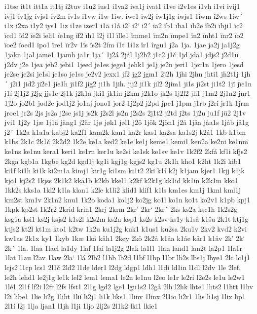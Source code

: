 i1tse
it1t
itt1a
it1tj
i2tuv
i1u2
ius1
i1va2
iva1j
ivat1
i1ve
i2v1es
i1vh
i1vi
ivij1
ivj1
iv1jg
ivjs1
iv2m
iv1s
i1vw
i1w
1iw.
iwc1
iw2j
iw1j1g
iwjs1
1iwm
i2ws
1iw´
i1x
i2xa
i1y2
iys1
1iz
i1ze
izer1
i1ä
i1å
i2'
i2`
i2´
ïa2
ïb1
ïba1
ïb2e
ïb2ï
ïbji1
ïc2
ïcd1
ïd2
ïe2i
ïeli1
ïe1ng
ïf2
ïh1
ï2j
ï1l
ïlle1
ïmme1
ïm2n
ïmpe1
ïn2
ïnht1
ïnr2
ïo2
ïoe2
ïoed1
ïpo1
ïre1
ïr2v
1ïs
ïs2t
2ím
í1t
1í1z
îr1
îrgu1
j2a
1ja.
1jae
ja2j
ja1j2g
1jakn
1jal
jame1
1jamh
ja1r
1ja´
1j2á
2jál
1j2b2
j1c2
j1č
1jd
jda1
jdjs2
j2d1u
j2dv
j2e
1jea
jeb2
jebi1
1jeed
je1es
jege1
jehk1
je1j
je2n
jeri1
1jer1n
1jero
1jesd
je2se
je2si
je1sl
je1so
je1ss
je2v2
jexx1
jf2
jg2
jgm1
2j2h
1jhi
2jhn
jhti1
jh2t1j
1jh´
j2i1
jid2
ji2e1
jie1h
ji1f2
jig2
ji1h
1jih.
jij2
ji1k
jil2
2jim1
ji1s
ji2st
ji1t2
1jï
jïe1n
j1í
2j1j2
j2jg
jjs1e
2j1k
j2k1a
jki1
jk1in
j2km
j2k1o
jk2s
1j2l2
jli1
j1m2
2j1n2
jnr1
1j2o
jo2b1
jod2e
jod1j2
jo1nj
jono1
jor2
1j2p2
j2pd
jpe1
j1pm
j1rb
j2ri
jr1k
1jrm
jroe1
jr2s
2js
js2a
j2se
js1j
js2k
j2s2l
js2n
j2s2s
2j1t2
j2td
j2ts
1j2u
ju1f
jü2
2j1v
jvi1
1j2y
1jæ
1j1ä
jäng1
j2är
1jø
jøk1
jøl1
j2ö
1jök
2jön1
j2å
1jåa
jåa1s
1jåb
jå1g
j2´
1k2a
k1a1a
kabj2
ka2f1
kam2k
kan1
ka2r
kas1
ka2sa
ka1s2j
k2á1
1kb
k1bm
k1bs
2k1c
2k1č
2k2d2
1k2e
ke1a
ked2
ke1e
ke1j
keme1
kemi1
ken2a
ke2ni
ke1nm
ke1ns
ke1nu
kera1
keri1
ke1rn
ker1u
ke2si
ke1sk
ke1sv
ke1v
1k2f2
2kfá
kf1i
kfjs2
2kga
kgb1a
1kgbe
kg2d
kgd1j
kg1i
kgj1g
kgjs2
kg1u
2k1h
kho1
k2ht
1k2i
kib1
ki1f
ki1h
ki1k
ki2m1a
kimj1
kir1g
ki1sm
ki1t2
2kï
k1í
k2j
k1jam
kjer1
1kjj
k1jk
kjo1
kj2s2
1kjss
2k1k2
kka1b
k2kb
kkel1
k2kf
k2k1g
kk1id
kk1in
k2k1m
kko1
1kk2s
kks1a
1kl2
k1la
klan1
k2le
k1li2
klid1
klif1
k1ls
km1es
km1j
1kml
kml1j
km2st
km1v
2k1n2
knu1
1k2o
koda1
ko1j2
ko2jg
ko1l
ko1n
ko1t
ko2v1
k1pb
kpj1
1kpk
kp2st
1k2r2
2krid
krin1
2krj
2krm
2kr'
2kr`
2kr´
2ks
ks2a
kse1h
1k2s2g
ksg1a
ksi1
ks2j
ksjs2
k1s2l
k2s2m
ks2n
ksp1
ks2s
k2sv
ks1y
k1så
k1šu
2k1t
ktj1g
ktjs2
kt2l
kt1m
kto1
k2tw
1k2u
ku1j2g
kuk1
k1us1
ku2sa
2ku1v
2kv2
kvd2
k2vi
kw1as
2k1x
ky1
1kyb
1kæ
1kä
käh1
2køy
2kö
2k2å
k1åa
k1åe
kår1
k1åv
2k'
2k`
2k´
1la.
1laa
1lacl
la1dy
1laf
1lai
la1j2g
2lak
la1l1
1lan
land1
lan2t
la2p1
1la1r
1lat
l1au
l2av
1law
2la`
1lá
2lb2
l1bb
lb2d
l1bf
l1bp
l1br
lb2s
lbs1j
lbye1
2lc
lc1j1
lcjs2
l1cp
lcs1
2l1č
2ld2
l1de
lder1
l2dg
ldgp1
ldh1
l1di
ld1in
l1dl
l2dv
1le
2lef.
le2h
lehd1
le2j1g
le1k
lel2
lem1
lema1
le2n
le1nu
l2eo
le1r
le2ri
l2e2s
le1u
le2w1
1lé1
2l1f
lf2i
l2fr
l2fs
lfst1
2l1g
lgd2
lge1
lgu1s2
l2gå
2lh
l2hk
lhte1
lhts2
l1htt
l1hv
l2i
libe1
1lie
li2g
1liht
1lií
li2j1
li1k
liks1
1linv
1linx
2l1io
li2r1
1lis
li1sj
1lix
lïp1
2l1í
l2j
1lja
ljan1
l1jh
l1ji
1ljo
2lj2s
2l1k2
lki1
lkie1

